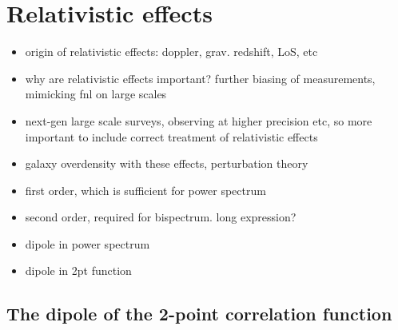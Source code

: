 
\chapter{Relativistic effects}
\label{chapter:introreleff}

\begin{itemize}
	\item origin of relativistic effects: doppler, grav. redshift, LoS, etc
	\item why are relativistic effects important? further biasing of measurements, mimicking fnl on large scales
	\item next-gen large scale surveys, observing at higher precision etc, so more important to include correct treatment of relativistic effects
	\item galaxy overdensity with these effects, perturbation theory
	\item first order, which is sufficient for power spectrum
	\item second order, required for bispectrum. long expression? 
	\item dipole in power spectrum
	\item dipole in 2pt function
\end{itemize}


\section{The dipole of the 2-point correlation function}

